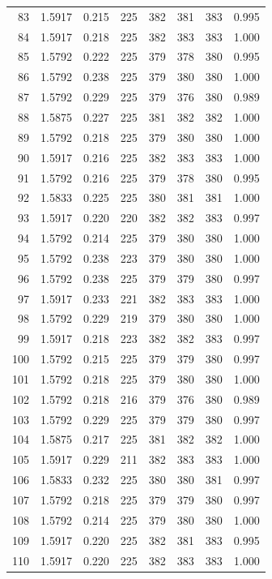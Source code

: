 \documentclass[10pt]{article}
\begin{document}
\begin{longtable}{rrrrrrrr}
83 & 1.5917 & 0.215 & 225 & 382 & 381 & 383 & 0.995\\
84 & 1.5917 & 0.218 & 225 & 382 & 383 & 383 & 1.000\\
85 & 1.5792 & 0.222 & 225 & 379 & 378 & 380 & 0.995\\
86 & 1.5792 & 0.238 & 225 & 379 & 380 & 380 & 1.000\\
87 & 1.5792 & 0.229 & 225 & 379 & 376 & 380 & 0.989\\
88 & 1.5875 & 0.227 & 225 & 381 & 382 & 382 & 1.000\\
89 & 1.5792 & 0.218 & 225 & 379 & 380 & 380 & 1.000\\
90 & 1.5917 & 0.216 & 225 & 382 & 383 & 383 & 1.000\\
91 & 1.5792 & 0.216 & 225 & 379 & 378 & 380 & 0.995\\
92 & 1.5833 & 0.225 & 225 & 380 & 381 & 381 & 1.000\\
93 & 1.5917 & 0.220 & 220 & 382 & 382 & 383 & 0.997\\
94 & 1.5792 & 0.214 & 225 & 379 & 380 & 380 & 1.000\\
95 & 1.5792 & 0.238 & 223 & 379 & 380 & 380 & 1.000\\
96 & 1.5792 & 0.238 & 225 & 379 & 379 & 380 & 0.997\\
97 & 1.5917 & 0.233 & 221 & 382 & 383 & 383 & 1.000\\
98 & 1.5792 & 0.229 & 219 & 379 & 380 & 380 & 1.000\\
99 & 1.5917 & 0.218 & 223 & 382 & 382 & 383 & 0.997\\
100 & 1.5792 & 0.215 & 225 & 379 & 379 & 380 & 0.997\\
101 & 1.5792 & 0.218 & 225 & 379 & 380 & 380 & 1.000\\
102 & 1.5792 & 0.218 & 216 & 379 & 376 & 380 & 0.989\\
103 & 1.5792 & 0.229 & 225 & 379 & 379 & 380 & 0.997\\
104 & 1.5875 & 0.217 & 225 & 381 & 382 & 382 & 1.000\\
105 & 1.5917 & 0.229 & 211 & 382 & 383 & 383 & 1.000\\
106 & 1.5833 & 0.232 & 225 & 380 & 380 & 381 & 0.997\\
107 & 1.5792 & 0.218 & 225 & 379 & 379 & 380 & 0.997\\
108 & 1.5792 & 0.214 & 225 & 379 & 380 & 380 & 1.000\\
109 & 1.5917 & 0.220 & 225 & 382 & 381 & 383 & 0.995\\
110 & 1.5917 & 0.220 & 225 & 382 & 383 & 383 & 1.000\\

\end{longtable}
\end{document}
